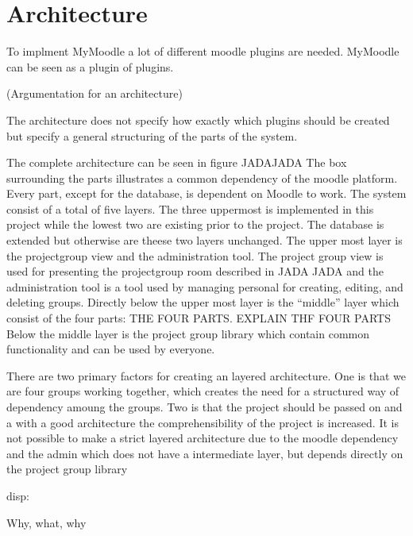 \section{Architecture}

To implment MyMoodle a lot of different moodle plugins are needed. 
MyMoodle can be seen as a plugin of plugins. 

(Argumentation for an architecture)


The architecture does not specify how exactly which plugins should be created but specify a general structuring of the parts of the system. 


The complete architecture can be seen in figure JADAJADA
The box surrounding the parts illustrates a common dependency of the moodle platform. 
Every part, except for the database, is dependent on Moodle to work. 
The system consist of a total of five layers. 
The three uppermost is implemented in this project while the lowest two are existing prior to the project. 
The database is extended but otherwise are theese two layers unchanged.
The upper most layer is the projectgroup view and the administration tool.
The project group view is used for presenting the projectgroup room described in JADA JADA and the administration tool is a tool used by managing personal for creating, editing, and deleting groups. 
Directly below the upper most layer is the ``middle'' layer which consist of the four parts: THE FOUR PARTS. 
EXPLAIN THF FOUR PARTS
Below the middle layer is the project group library which contain common functionality and can be used by everyone.  



There are two primary factors for creating an layered architecture. One is that we are four groups working together, which creates the need for a structured way of dependency amoung the groups. Two is that the project should be passed on and a with a good architecture the comprehensibility of the project is increased. 
It is not possible to make a strict layered architecture due to the moodle dependency and the admin which does not have a intermediate layer, but depends directly on the project group library












disp: 

Why, what, why







